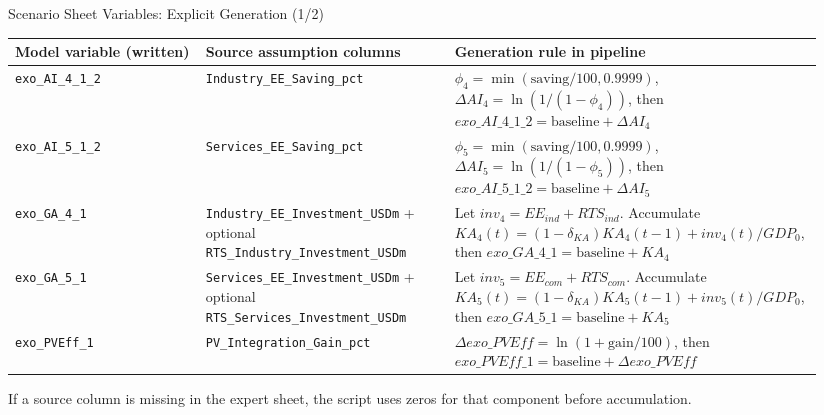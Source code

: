\documentclass[aspectratio=169]{beamer}
\begin{document}
\begin{frame}{Scenario Sheet Variables: Explicit Generation (1/2)}
\scriptsize
\begin{tabular}{>{\raggedright\arraybackslash}p{0.23\linewidth}>{\raggedright\arraybackslash}p{0.30\linewidth}>{\raggedright\arraybackslash}p{0.41\linewidth}}
\toprule
Model variable (written) & Source assumption columns & Generation rule in pipeline \\
\midrule
\texttt{exo\_AI\_4\_1\_2} & \texttt{Industry\_EE\_Saving\_pct} &
$\phi_4=\min(\text{saving}/100,0.9999)$, $\Delta AI_4=\ln(1/(1-\phi_4))$, then
$exo\_AI\_4\_1\_2=\text{baseline}+\Delta AI_4$ \\

\texttt{exo\_AI\_5\_1\_2} & \texttt{Services\_EE\_Saving\_pct} &
$\phi_5=\min(\text{saving}/100,0.9999)$, $\Delta AI_5=\ln(1/(1-\phi_5))$, then
$exo\_AI\_5\_1\_2=\text{baseline}+\Delta AI_5$ \\

\texttt{exo\_GA\_4\_1} & \texttt{Industry\_EE\_Investment\_USDm} + optional \texttt{RTS\_Industry\_Investment\_USDm} &
Let $inv_4=EE_{ind}+RTS_{ind}$. Accumulate
$KA_4(t)=(1-\delta_{KA})KA_4(t-1)+inv_4(t)/GDP_0$, then
$exo\_GA\_4\_1=\text{baseline}+KA_4$ \\

\texttt{exo\_GA\_5\_1} & \texttt{Services\_EE\_Investment\_USDm} + optional \texttt{RTS\_Services\_Investment\_USDm} &
Let $inv_5=EE_{com}+RTS_{com}$. Accumulate
$KA_5(t)=(1-\delta_{KA})KA_5(t-1)+inv_5(t)/GDP_0$, then
$exo\_GA\_5\_1=\text{baseline}+KA_5$ \\

\texttt{exo\_PVEff\_1} & \texttt{PV\_Integration\_Gain\_pct} &
$\Delta exo\_PVEff=\ln(1+\text{gain}/100)$, then
$exo\_PVEff\_1=\text{baseline}+\Delta exo\_PVEff$ \\
\bottomrule
\end{tabular}

\vspace{0.4em}
\scriptsize
If a source column is missing in the expert sheet, the script uses zeros for that component before accumulation.
\end{frame}
\end{document}
